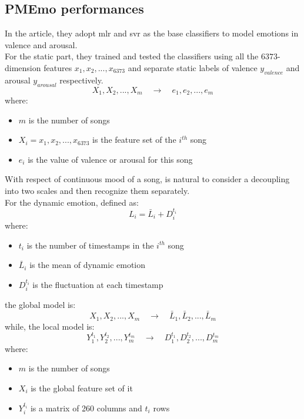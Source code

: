 \subsection{PMEmo performances}
In the article, they adopt \gls{mlr} and \gls{svr} as the base classifiers to model emotions in valence and arousal.
\\
For the static part, they trained and tested the classifiers using all the $6373$-dimension features $x_1,x_2,...,x_{6373}$ and separate static labels of valence $y_{valence}$ and arousal $y_{arousal}$ respectively.
\begin{equation}
	{X_1,X_2,...,X_m} \quad \rightarrow \quad {e_1,e_2,...,e_m}
\end{equation}
where:
\begin{itemize}
	\item $m$ is the number of songs
	\item $X_i={x_1,x_2,...,x_{6373}}$ is the feature set of the $i^{th}$ song
	\item $e_i$ is the value of valence or arousal for this song
\end{itemize}
With respect of continuous mood of a song, is natural to consider a decoupling into two scales and then recognize them separately.
\\
For the dynamic emotion, defined as:
\begin{equation}
	L_i=\bar{L}_i+D_i^{t_i}
\end{equation}
where:
\begin{itemize}
	\item $t_i$ is the number of timestamps in the $i^{th}$ song
	\item $\bar{L}_i$ is the mean of dynamic emotion
	\item $D_i^{t_i}$ is the fluctuation at each timestamp
\end{itemize}
the global model is:
\begin{equation}
	{X_1,X_2,...,X_m} \quad \rightarrow \quad {\bar{L}_1,\bar{L}_2,...,\bar{L}_m}
\end{equation}
while, the local model is:
\begin{equation}
	{Y_1^{t_1},Y_2^{t_2},...,Y_m^{t_m}} \quad \rightarrow \quad {D_1^{t_1},D_2^{t_2},...,D_m^{t_m}}
\end{equation}
where:
\begin{itemize}
	\item $m$ is the number of songs
	\item $X_i$ is the global feature set of it
	\item $Y_i^{t_i}$ is a matrix of 260 columns and $t_i$ rows
\end{itemize}
